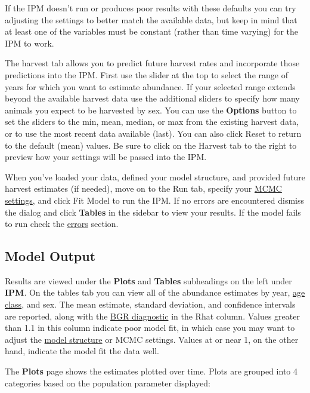 \documentclass[
]{book}
\begin{document}
If the IPM doesn't run or produces poor results with these defaults you can try adjusting the settings to better match the available data, but keep in mind that at least one of the variables must be constant (rather than time varying) for the IPM to work.

The harvest tab allows you to predict future harvest rates and incorporate those predictions into the IPM. First use the slider at the top to select the range of years for which you want to estimate abundance. If your selected range extends beyond the available harvest data use the additional sliders to specify how many animals you expect to be harvested by sex. You can use the \textbf{Options} button to set the sliders to the min, mean, median, or max from the existing harvest data, or to use the most recent data available (last). You can also click {Reset} to return to the default (mean) values. Be sure to click on the Harvest tab to the right to preview how your settings will be passed into the IPM.

When you've loaded your data, defined your model structure, and provided future harvest estimates (if needed), move on to the Run tab, specify your \protect\hyperlink{gl-mcmc}{MCMC settings}, and click {Fit Model} to run the IPM. If no errors are encountered dismiss the dialog and click \textbf{Tables} in the sidebar to view your results. If the model fails to run check the \protect\hyperlink{surv-errors}{errors} section.

\hypertarget{ipm-output}{%
\subsection{Model Output}\label{ipm-output}}

Results are viewed under the \textbf{Plots} and \textbf{Tables} subheadings on the left under \textbf{IPM}. On the tables tab you can view all of the abundance estimates by year, \protect\hyperlink{gl-age-classes}{age class}, and sex. The mean estimate, standard deviation, and confidence intervals are reported, along with the \protect\hyperlink{gl-rhat}{BGR diagnostic} in the Rhat column. Values greater than 1.1 in this column indicate poor model fit, in which case you may want to adjust the \protect\hyperlink{ipm-options}{model structure} or MCMC settings. Values at or near 1, on the other hand, indicate the model fit the data well.

The \textbf{Plots} page shows the estimates plotted over time. Plots are grouped into 4 categories based on the population parameter displayed:
\end{document}

